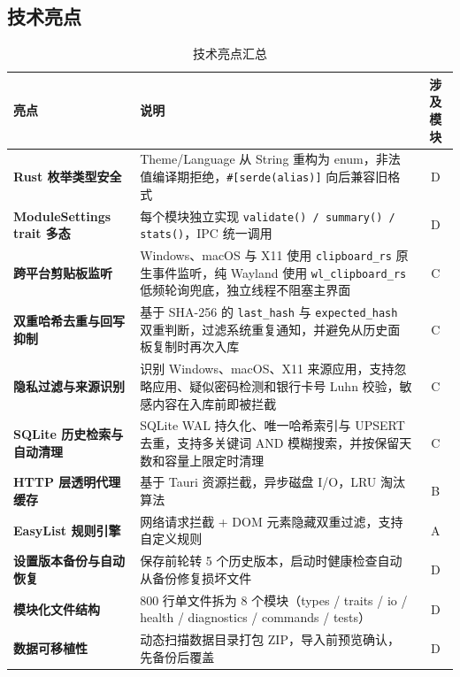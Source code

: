 \documentclass[12pt,a4paper]{ctexart}
\begin{document}
\subsection{技术亮点}

\begin{table}[htbp]
\centering
\small
\begin{tabularx}{\textwidth}{lXc}
\toprule
亮点 & 说明 & 涉及模块 \\
\midrule
\textbf{Rust 枚举类型安全} & Theme/Language 从 String 重构为 enum，非法值编译期拒绝，\texttt{\#[serde(alias)]} 向后兼容旧格式 & D \\
\textbf{ModuleSettings trait 多态} & 每个模块独立实现 \texttt{validate() / summary() / stats()}，IPC 统一调用 & D \\
\textbf{跨平台剪贴板监听} & Windows、macOS 与 X11 使用 \texttt{clipboard\_rs} 原生事件监听，纯 Wayland 使用 \texttt{wl\_clipboard\_rs} 低频轮询兜底，独立线程不阻塞主界面 & C \\
\textbf{双重哈希去重与回写抑制} & 基于 SHA-256 的 \texttt{last\_hash} 与 \texttt{expected\_hash} 双重判断，过滤系统重复通知，并避免从历史面板复制时再次入库 & C \\
\textbf{隐私过滤与来源识别} & 识别 Windows、macOS、X11 来源应用，支持忽略应用、疑似密码检测和银行卡号 Luhn 校验，敏感内容在入库前即被拦截 & C \\
\textbf{SQLite 历史检索与自动清理} & SQLite WAL 持久化、唯一哈希索引与 UPSERT 去重，支持多关键词 AND 模糊搜索，并按保留天数和容量上限定时清理 & C \\
\textbf{HTTP 层透明代理缓存} & 基于 Tauri 资源拦截，异步磁盘 I/O，LRU 淘汰算法 & B \\
\textbf{EasyList 规则引擎} & 网络请求拦截 + DOM 元素隐藏双重过滤，支持自定义规则 & A \\
\textbf{设置版本备份与自动恢复} & 保存前轮转 5 个历史版本，启动时健康检查自动从备份修复损坏文件 & D \\
\textbf{模块化文件结构} & 800 行单文件拆为 8 个模块（types / traits / io / health / diagnostics / commands / tests） & D \\
\textbf{数据可移植性} & 动态扫描数据目录打包 ZIP，导入前预览确认，先备份后覆盖 & D \\
\bottomrule
\end{tabularx}
\caption{技术亮点汇总}
\end{table}

\end{document}
